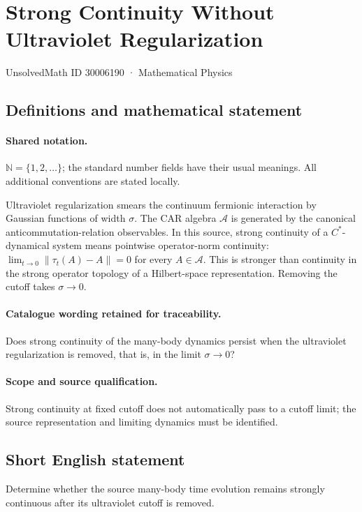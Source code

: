 \documentclass[11pt]{article}
\begin{document}
\setcounter{section}{30006189}
\section{Strong Continuity Without Ultraviolet Regularization}\label{30006190}
{\small UnsolvedMath ID 30006190 · Mathematical Physics}
\subsection{Definitions and mathematical statement}

\paragraph{Shared notation.}$\mathbb N=\{1,2,\ldots\}$; the standard number fields have their usual meanings. All additional conventions are stated locally.


Ultraviolet regularization smears the continuum fermionic interaction by Gaussian functions of width $\sigma$. The CAR algebra $\mathcal A$ is generated by the canonical anticommutation-relation observables. In this source, strong continuity of a $C^*$-dynamical system means pointwise operator-norm continuity: $\lim_{t\to0}\|\tau_t(A)-A\|=0$ for every $A\in\mathcal A$. This is stronger than continuity in the strong operator topology of a Hilbert-space representation. Removing the cutoff takes $\sigma\to0$.

\paragraph{Catalogue wording retained for traceability.}
Does strong continuity of the many-body dynamics persist when the ultraviolet regularization is removed, that is, in the limit $\sigma\to 0$?

\paragraph{Scope and source qualification.}Strong continuity at fixed cutoff does not automatically pass to a cutoff limit; the source representation and limiting dynamics must be identified.
\subsection{Short English statement}
Determine whether the source many-body time evolution remains strongly continuous after its ultraviolet cutoff is removed.
\end{document}
